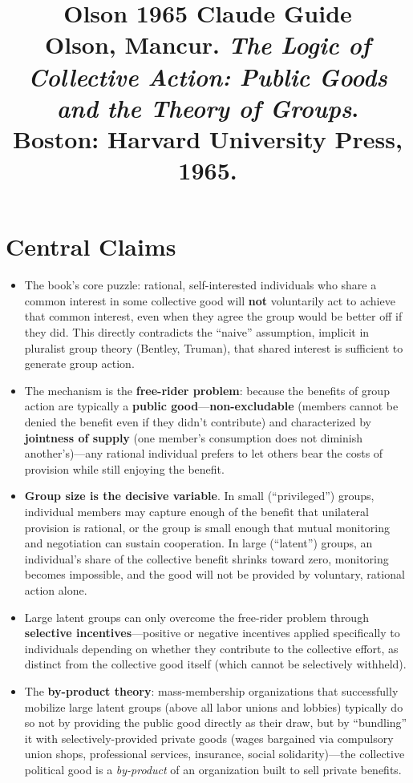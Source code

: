 \documentclass[12pt]{article}
\title{\textbf{Olson 1965 Claude Guide}\\
\large Olson, Mancur. \textit{The Logic of Collective Action: Public Goods and the Theory of Groups}.\\
Boston: Harvard University Press, 1965.}
\author{}
\date{}
\begin{document}
\maketitle
\tableofcontents
\newpage

\section{Central Claims}

\begin{itemize}[leftmargin=*, itemsep=4pt]
    \item The book's core puzzle: rational, self-interested individuals who share a common interest in some collective good will \textbf{not} voluntarily act to achieve that common interest, even when they agree the group would be better off if they did. This directly contradicts the ``naive'' assumption, implicit in pluralist group theory (Bentley, Truman), that shared interest is sufficient to generate group action.
    \item The mechanism is the \textbf{free-rider problem}: because the benefits of group action are typically a \textbf{public good}---\textbf{non-excludable} (members cannot be denied the benefit even if they didn't contribute) and characterized by \textbf{jointness of supply} (one member's consumption does not diminish another's)---any rational individual prefers to let others bear the costs of provision while still enjoying the benefit.
    \item \textbf{Group size is the decisive variable}. In small (``privileged'') groups, individual members may capture enough of the benefit that unilateral provision is rational, or the group is small enough that mutual monitoring and negotiation can sustain cooperation. In large (``latent'') groups, an individual's share of the collective benefit shrinks toward zero, monitoring becomes impossible, and the good will not be provided by voluntary, rational action alone.
    \item Large latent groups can only overcome the free-rider problem through \textbf{selective incentives}---positive or negative incentives applied specifically to individuals depending on whether they contribute to the collective effort, as distinct from the collective good itself (which cannot be selectively withheld).
    \item The \textbf{by-product theory}: mass-membership organizations that successfully mobilize large latent groups (above all labor unions and lobbies) typically do so not by providing the public good directly as their draw, but by ``bundling'' it with selectively-provided private goods (wages bargained via compulsory union shops, professional services, insurance, social solidarity)---the collective political good is a \emph{by-product} of an organization built to sell private benefits.

\end{itemize}
\end{document}
